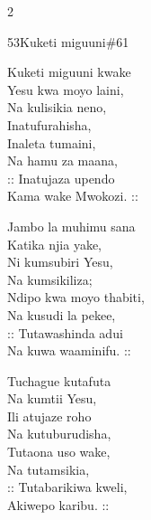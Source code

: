 \documentclass{article}
\begin{document}
\begin{multicols}{2}
\begin{hymn}{53}{Kuketi miguuni}{\#61}
\begin{stanza}
Kuketi miguuni kwake\\
Yesu kwa moyo laini,\\
Na kulisikia neno,\\
Inatufurahisha,\\
Inaleta tumaini,\\
Na hamu za maana,\\
:: Inatujaza upendo\\
Kama wake Mwokozi. ::
\end{stanza}
\begin{stanza}
Jambo la muhimu sana\\
Katika njia yake,\\
Ni kumsubiri Yesu,\\
Na kumsikiliza;\\
Ndipo kwa moyo thabiti,\\
Na kusudi la pekee,\\
:: Tutawashinda adui\\
Na kuwa waaminifu. ::
\end{stanza}
\begin{stanza}
Tuchague kutafuta\\
Na kumtii Yesu,\\
Ili atujaze roho\\
Na kutuburudisha,\\
Tutaona uso wake,\\
Na tutamsikia,\\
:: Tutabarikiwa kweli,\\
Akiwepo karibu. ::
\end{stanza}
\end{hymn}


\end{multicols}
\end{document}
